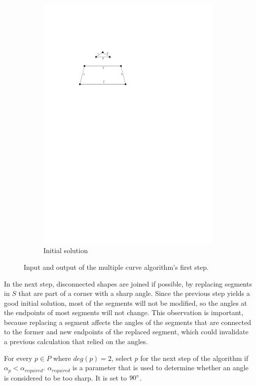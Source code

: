\documentclass[11pt]{article}
\begin{document}
\begin{figure}[hbtp]
\begin{subfigure}{.33\linewidth}
  \includegraphics[width=0.9\linewidth]{multiplecurves/algo_step1_add_lines_with_numbers.pdf}
  \caption{Initial solution}
\end{subfigure}%
  \caption{Input and output of the multiple curve algorithm's first step.}
\label{fig:multiple_initial_solution}
\end{figure}

In the next step, disconnected shapes are joined if possible, by replacing segments in $S$ that are part of a corner with a sharp angle. Since the previous step yields a good initial solution, most of the segments will not be modified, so the angles at the endpoints of most segments will not change. This observation is important, because replacing a segment affects the angles of the segments that are connected to the former and new endpoints of the replaced segment, which could invalidate a previous calculation that relied on the angles.

For every $p \in P$ where $deg(p) = 2$, select $p$ for the next step of the algorithm if $\alpha_p < \alpha_{required}$. $\alpha_{required}$ is a parameter that is used to determine whether an angle is considered to be too sharp. It is set to $90\degree$.
\end{document}
